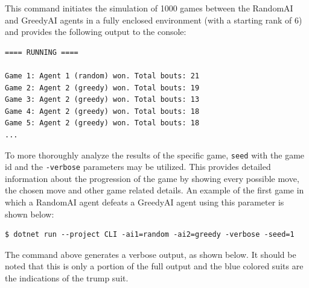 This command initiates the simulation of 1000 games between the RandomAI and GreedyAI agents in a fully enclosed environment (with a starting rank of 6) and provides the following output to the console:

\begin{lstlisting}[frame=single]
==== RUNNING ====

Game 1: Agent 1 (random) won. Total bouts: 21
Game 2: Agent 2 (greedy) won. Total bouts: 19
Game 3: Agent 2 (greedy) won. Total bouts: 13
Game 4: Agent 2 (greedy) won. Total bouts: 18
Game 5: Agent 2 (greedy) won. Total bouts: 18
...
\end{lstlisting}

To more thoroughly analyze the results of the specific game, \texttt{seed} with the game id and the \texttt{-verbose}  parameters may be utilized. This provides detailed information about the progression of the game by showing every possible move, the chosen move and other game related details. An example of the first game in which a RandomAI agent defeats a GreedyAI agent using this parameter is shown below:


\begin{lstlisting}[frame=single]
$ dotnet run --project CLI -ai1=random -ai2=greedy -verbose -seed=1
\end{lstlisting}

The command above generates a verbose output, as shown below. It should be noted that this is only a portion of the full output and the blue colored suits are the indications of the trump suit.


